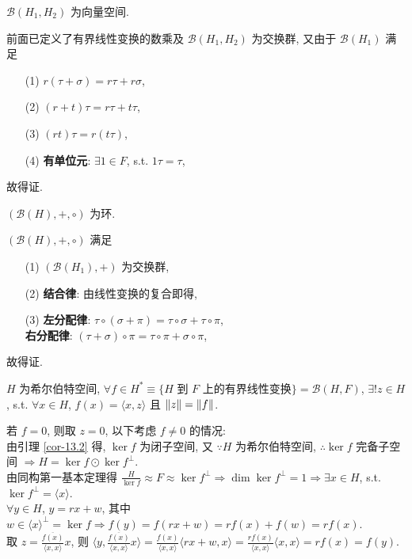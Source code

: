 \documentclass{note}
\begin{document}
$\mathcal{B}(H_1,H_2)$ 为向量空间.
\begin{pf}
    前面已定义了有界线性变换的数乘及 $\mathcal{B}(H_1,H_2)$ 为交换群, 又由于 $\mathcal{B}(H_1)$ 满足
    \begin{itemize}
        \item[(1)] $r(\tau+\sigma)=r\tau+r\sigma$,
        \item[(2)] $(r+t)\tau=r\tau+t\tau$,
        \item[(3)] $(rt)\tau=r(t\tau)$,
        \item[(4)] \textbf{有单位元}: $\exists 1\in F$, s.t. $1\tau=\tau$,
    \end{itemize}
    故得证.
\end{pf}

$(\mathcal{B}(H),+,\circ)$ 为环.
\begin{pf}
    $(\mathcal{B}(H),+,\circ)$ 满足
    \begin{itemize}
        \item[(1)] $(\mathcal{B}(H_1),+)$ 为交换群,
        \item[(2)] \textbf{结合律}: 由线性变换的复合即得,
        \item[(3)] \textbf{左分配律}: $\tau\circ(\sigma+\pi)=\tau\circ\sigma+\tau\circ\pi$,\\
        \textbf{右分配律}: $(\tau+\sigma)\circ\pi=\tau\circ\pi+\sigma\circ\pi$,
    \end{itemize}
    故得证.
\end{pf}

\begin{thm}
    $H$ 为希尔伯特空间, $\forall f\in H^*\equiv\{H$ 到 $F$ 上的有界线性变换$\}=\mathcal{B}(H,F)$, $\exists!z\in H$, s.t. $\forall x\in H$, $f(x)=\langle x,z\rangle$ 且 $\left\lVert z\right\rVert=\left\lVert f\right\rVert$.
\end{thm}
\begin{pf}
    若 $f=0$, 则取 $z=0$, 以下考虑 $f\neq 0$ 的情况:\\
    由引理 \ref{cor-13.2} 得, $\ker f$ 为闭子空间, 又 $\because H$ 为希尔伯特空间, $\therefore\ker f$ 完备子空间 $\Longrightarrow H=\ker f\odot\ker f^{\perp}$.\\
    由同构第一基本定理得 $\frac{H}{\ker f}\approx F\approx\ker f^{\perp}\Longrightarrow\dim\ker f^{\perp}=1\Longrightarrow\exists x\in H$, s.t. $\ker f^{\perp}=\langle x\rangle$.\\
    $\forall y\in H$, $y=rx+w$, 其中 $w\in\langle x\rangle^{\perp}=\ker f\Longrightarrow f(y)=f(rx+w)=rf(x)+f(w)=rf(x)$.\\
    取 $z=\frac{\overline{f(x)}}{\langle x,x\rangle}x$, 则 $\langle y,\frac{\overline{f(x)}}{\langle x,x\rangle}x\rangle=\frac{f(x)}{\langle x,x\rangle}\langle rx+w,x\rangle=\frac{rf(x)}{\langle x,x\rangle}\langle x,x\rangle=rf(x)=f(y)$.
\end{pf}
\end{document}
